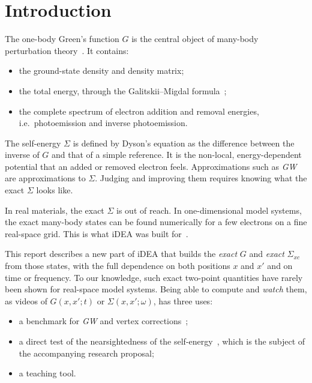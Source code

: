 \documentclass[11pt,a4paper]{article}
\newcommand{\GW}{\textit{GW}}
\newcommand{\iDEA}{iDEA}
\begin{document}
\tableofcontents

\section{Introduction}

The one-body Green's function $G$ is the central object of many-body perturbation theory~\cite{hedin1965,fetter1971,stefanucci2013,martin2016}. It contains:
\begin{itemize}
\item the ground-state density and density matrix;
\item the total energy, through the Galitskii--Migdal formula~\cite{galitskii1958};
\item the complete spectrum of electron addition and removal energies, i.e.\ photoemission and inverse photoemission.
\end{itemize}

The self-energy $\Sigma$ is defined by Dyson's equation as the difference between the inverse of $G$ and that of a simple reference. It is the non-local, energy-dependent potential that an added or removed electron feels. Approximations such as \GW{}~\cite{hedin1965} are approximations to $\Sigma$. Judging and improving them requires knowing what the exact $\Sigma$ looks like.

In real materials, the exact $\Sigma$ is out of reach. In one-dimensional model systems, the exact many-body states can be found numerically for a few electrons on a fine real-space grid. This is what \iDEA{} was built for~\cite{hodgson2013,hodgson2016,wetherell2018,wetherell2019}.

This report describes a new part of \iDEA{} that builds the \emph{exact} $G$ and \emph{exact} $\Sigma_{xc}$ from those states, with the full dependence on both positions $x$ and $x'$ and on time or frequency. To our knowledge, such exact two-point quantities have rarely been shown for real-space model systems. Being able to compute and \emph{watch} them, as videos of $G(x,x';t)$ or $\Sigma(x,x';\omega)$, has three uses:
\begin{itemize}
\item a benchmark for \GW{} and vertex corrections~\cite{romaniello2009,nelson2007,wetherell2018};
\item a direct test of the nearsightedness of the self-energy~\cite{kohn1996,prodan2005,wetherell2019}, which is the subject of the accompanying research proposal;
\item a teaching tool.
\end{itemize}
\end{document}
